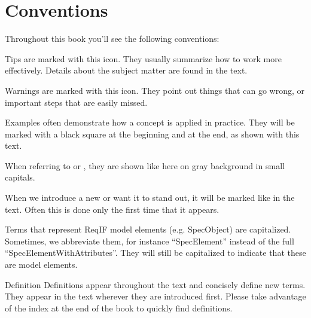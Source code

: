 % 

\section{Conventions}

Throughout this book you'll see the following conventions:

\begin{info}
Tips are marked with this icon.  They usually summarize how to work more effectively.  Details about the subject matter are found in the text.
\end{info}

\begin{warning}
Warnings are marked with this icon. They point out things that can go wrong, or important steps that are easily missed.
\end{warning}

\begin{example}
Examples often demonstrate how a concept is applied in practice.  They will be marked with a black square at the beginning and at the end, as shown with this text.
\end{example}

When referring to  or , they are shown like here on gray background in small capitals.

When we introduce a new  or want it to stand out, it will be marked like  in the text.  Often this is done only the first time that it appears.

Terms that represent ReqIF model elements (e.g. SpecObject) are capitalized. Sometimes, we abbreviate them, for instance ``SpecElement'' instead of the full ``SpecElementWithAttributes''.  They will still be capitalized to indicate that these are model elements.

\begin{definition}{Definition}
Definitions appear throughout the text and concisely define new terms.  They appear in the text wherever they are introduced first.  Please take advantage of the index at the end of the book to quickly find definitions.
\end{definition}
